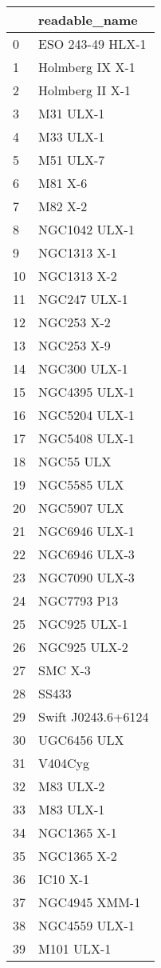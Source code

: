 \begin{tabular}{ll}
\toprule
{} &       readable_name \\
\midrule
0  &    ESO 243-49 HLX-1 \\
1  &     Holmberg IX X-1 \\
2  &     Holmberg II X-1 \\
3  &           M31 ULX-1 \\
4  &           M33 ULX-1 \\
5  &           M51 ULX-7 \\
6  &             M81 X-6 \\
7  &             M82 X-2 \\
8  &       NGC1042 ULX-1 \\
9  &         NGC1313 X-1 \\
10 &         NGC1313 X-2 \\
11 &        NGC247 ULX-1 \\
12 &          NGC253 X-2 \\
13 &          NGC253 X-9 \\
14 &        NGC300 ULX-1 \\
15 &       NGC4395 ULX-1 \\
16 &       NGC5204 ULX-1 \\
17 &       NGC5408 ULX-1 \\
18 &           NGC55 ULX \\
19 &         NGC5585 ULX \\
20 &         NGC5907 ULX \\
21 &       NGC6946 ULX-1 \\
22 &       NGC6946 ULX-3 \\
23 &       NGC7090 ULX-3 \\
24 &         NGC7793 P13 \\
25 &        NGC925 ULX-1 \\
26 &        NGC925 ULX-2 \\
27 &             SMC X-3 \\
28 &               SS433 \\
29 &  Swift J0243.6+6124 \\
30 &         UGC6456 ULX \\
31 &             V404Cyg \\
32 &           M83 ULX-2 \\
33 &           M83 ULX-1 \\
34 &         NGC1365 X-1 \\
35 &         NGC1365 X-2 \\
36 &            IC10 X-1 \\
37 &       NGC4945 XMM-1 \\
38 &       NGC4559 ULX-1 \\
39 &          M101 ULX-1 \\
\bottomrule
\end{tabular}
